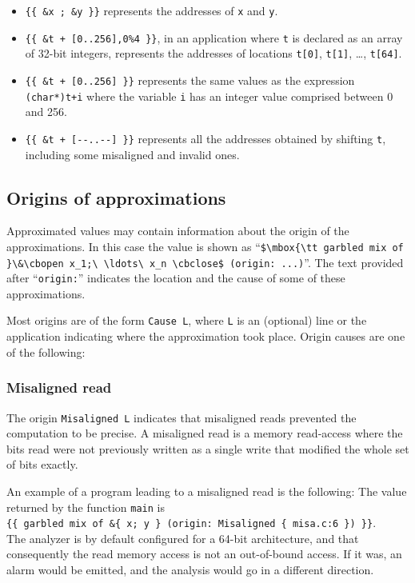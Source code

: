 \documentclass[web]{frama-c-book}
\newcommand{\cbopen}{\mbox{\tt \{}}
\newcommand{\cbclose}{\mbox{\tt \}}}
\begin{document}
\begin{itemize}
\item \lstinline|{{ &x ; &y }}|
      represents the addresses of \lstinline|x| and \lstinline|y|.

\item \lstinline|{{ &t + [0..256],0%4 }}|, in an application where
  \lstinline|t| is declared as an array of 32-bit integers, represents
  the addresses of locations \lstinline|t[0]|, \lstinline|t[1]|, \ldots, \lstinline|t[64]|.

\item \lstinline|{{ &t + [0..256] }}|
represents the same values as the expression \lstinline|(char*)t+i|
where the variable \lstinline|i| has an integer value comprised between 0 and 256.

\item \lstinline|{{ &t + [--..--] }}|
      represents all the addresses obtained by shifting \lstinline|t|, including
some misaligned and invalid ones.

\end{itemize}

\subsection{Origins of approximations}

Approximated values may  contain
information about the origin of the approximations.  In this
case the value is shown as ``\lstinline|$\mbox{\tt garbled mix of }\&\cbopen x_1;\ \ldots\ x_n \cbclose$ (origin: ...)|''.
The text provided after ``\lstinline|origin:|'' indicates the
location and the cause of
some of these approximations.
\goodbreak

Most origins are of the form \lstinline|Cause L|, where \lstinline|L|
is an (optional) line or the application indicating where the approximation
took place. Origin causes are one of the following:
\subsubsection{Misaligned read}
The origin \lstinline$Misaligned L$ indicates that
misaligned reads prevented the computation to be precise.
A misaligned read is a memory read-access where the bits read were not
previously written as a single write that modified the whole set of
bits exactly.

An example of a program leading to a misaligned read is the following:
The value returned by the function \lstinline|main| is\\
\lstinline|{{ garbled mix of &{ x; y } (origin: Misaligned { misa.c:6 }) }}|.\\
The analyzer is by default configured for a 64-bit architecture,
and that consequently the read memory access is not an out-of-bound access.
If it was, an alarm would be emitted, and the
analysis would go in a different direction.
\end{document}
